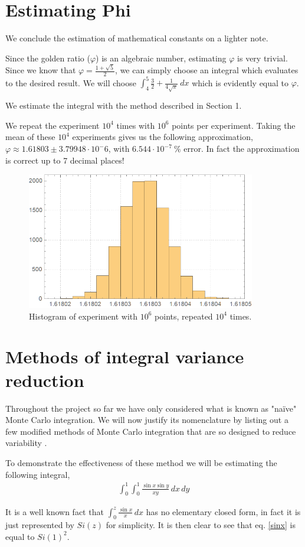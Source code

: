 \documentclass[12pt]{article}
\numberwithin{equation}{section}
\begin{document}
\section{Estimating Phi}
We conclude the estimation of mathematical constants on a lighter note.
\par Since the golden ratio ($\varphi$) is an algebraic number, estimating $\varphi$ is very trivial. Since we know that $\varphi = \frac{1+\sqrt{5}}{2}$, we can simply choose an integral which evaluates to the desired result. We will choose $\int_4^5 \frac{3}{2}+\frac{1}{4 \sqrt{x}}\ dx$ which is evidently equal to $\varphi$.
\par We estimate the integral with the method described in Section 1.
\par We repeat the experiment $10^4$ times with $10^6$ points per experiment. Taking the mean of these $10^4$ experiments gives us the following approximation, $\varphi \approx 1.61803 \pm 3.79948 \cdot 10^-6$, with $6.544 \cdot 10^{-7}\ \%$ error. In fact the approximation is correct up to 7 decimal places!
\begin{figure}[!htb]
    \centering
    \includegraphics[width=10cm]{Images/repeatedphi.png}
    \caption{Histogram of experiment with $10^6$ points, repeated $10^4$ times.}
    \label{fig:repeatedphi}
\end{figure}
\section{Methods of integral variance reduction}
Throughout the project so far we have only considered what is known as "naïve" Monte Carlo integration. We will now justify its nomenclature by listing out a few modified methods of Monte Carlo integration that are so designed to reduce variability \cite{caflisch_1998, anithetic}.
\par To demonstrate the effectiveness of these method we will be estimating the following integral,
\begin{align}
    \int_0^1 \int_0^1 \frac{\sin x \sin y}{x y}\, dx\, dy \label{sinx}
\end{align}
\par
It is a well known fact that $\int_0^z \frac{\sin x}{x}\, dx$ has no elementary closed form, in fact it is just represented by $Si(z)$ for simplicity. It is then clear to see that eq. \ref{sinx} is equal to $Si(1)^2$.
\end{document}
